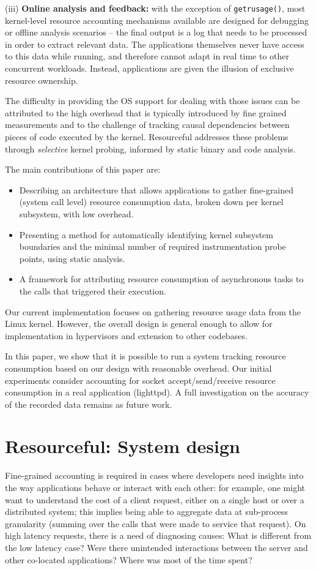 \documentclass[12pt,twoside,a4paper]{article}
\newcommand{\pname}{Resourceful}
\begin{document}
(iii) \textbf{Online analysis and feedback:} with the exception of
\texttt{getrusage()}, most kernel-level resource accounting mechanisms available
are designed for debugging or offline analysis scenarios -- the final output is
a log that needs to be processed in order to extract relevant data. The
applications themselves never have access to this data while running, and
therefore cannot adapt in real time to other concurrent workloads. Instead,
applications are given the illusion of exclusive resource ownership.

The difficulty in providing the OS support for dealing with those issues can be
attributed to the high overhead that is typically introduced by fine grained
measurements and to the challenge of tracking causal dependencies between pieces
of code executed by the kernel. \pname{ }addresses these problems through
\emph{selective} kernel probing, informed by static binary and code analysis.

The main contributions of this paper are: 

\begin{itemize} 
\item Describing an architecture that allows applications to gather fine-grained
(system call level) resource consumption data, broken down per kernel subsystem,
with low overhead.
\item Presenting a method for automatically identifying kernel subsystem
boundaries and the minimal number of required instrumentation probe points,
using static analysis.
\item A framework for attributing resource consumption of asynchronous
tasks to the calls that triggered their execution.
\end{itemize}

Our current implementation focuses on gathering resource usage data from the
Linux kernel.  However, the overall design is general enough to allow for
implementation in hypervisors and extension to other codebases. 

In this paper, we show that it is possible to run a system tracking resource
consumption based on our design with reasonable overhead. Our initial experiments
consider accounting for socket accept/send/receive resource consumption in a
real application (lighttpd). A full investigation on the accuracy of the
recorded data remains as future work.


\section{\pname: System design} 
Fine-grained accounting is required in cases where developers need insights into the way applications behave or interact with each other: for example, one might want to understand the cost of a client request, either on a single host or over a distributed system; this implies being able to aggregate data at sub-process granularity (summing over the calls that were made to service that request). On high latency requests, there is a need of diagnosing causes: What is different from the low latency case? Were there unintended interactions between the server and other co-located applications? Where was most of the time spent?
\end{document}
